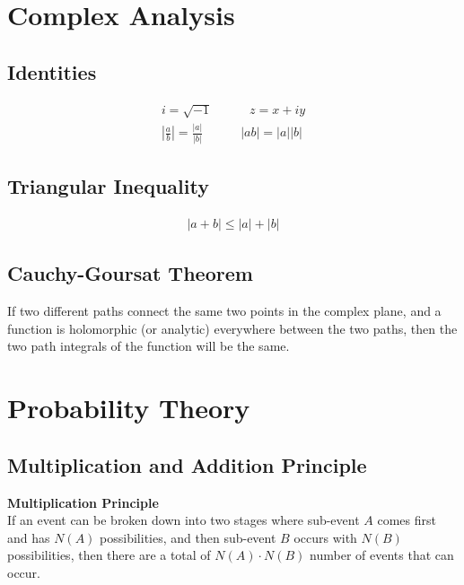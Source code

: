 \documentclass{article}
\numberwithin{theorem}{subsection}
\numberwithin{theorem}{subsubsection}
\theoremstyle{definition}
\numberwithin{definition}{subsection}
\numberwithin{definition}{subsubsection}
\begin{document}
\section{Complex Analysis}

\subsection{Identities}

\begin{gather*}
    i = \sqrt{-1} \quad \quad \quad z = x + iy \\
    \left | \frac{a}{b}\right | = \frac{|a|}{|b|} \quad \quad \quad |ab| = |a||b|
\end{gather*}

\subsection{Triangular Inequality}
\begin{gather*}
    |a + b| \leq |a| + |b|
\end{gather*}

\subsection{Cauchy-Goursat Theorem}

If two different paths connect the same two points in the complex plane, and a function is holomorphic (or analytic) everywhere between the two paths, then the two path integrals of the function will be the same.


\begin{comment}
======================================================================================================================================================================================================================================================================================PROBABILITY THEORY================================================ ====================================================================================================================================================================================================================================
\end{comment}

\section{Probability Theory}

\subsection{Multiplication and Addition Principle}
\noindent \textbf{Multiplication Principle} \\
\indent If an event can be broken down into two stages where sub-event $A$ comes first and has $N(A)$ possibilities, and then sub-event $B$ occurs with $N(B)$ possibilities, then there are a total of $N(A) \cdot N(B)$ number of events that can occur. \\
\end{document}
